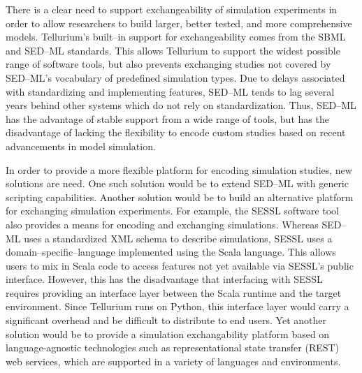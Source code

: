 \documentclass[10pt,letterpaper]{article}
\begin{document}
There is a clear need to support exchangeability of simulation experiments in order to allow researchers to build larger, better tested, and more comprehensive models. Tellurium's built--in support for exchangeability comes from the SBML and SED--ML standards. This allows Tellurium to support the widest possible range of software tools, but also prevents exchanging studies not covered by SED--ML's vocabulary of predefined simulation types. Due to delays associated with standardizing and implementing features, SED--ML tends to lag several years behind other systems which do not rely on standardization. Thus, SED--ML has the advantage of stable support from a wide range of tools, but has the disadvantage of lacking the flexibility to encode custom studies based on recent advancements in model simulation.

In order to provide a more flexible platform for encoding simulation studies, new solutions are need. One such solution would be to extend SED--ML with generic scripting capabilities. Another solution would be to build an alternative platform for exchanging simulation experiments. For example, the SESSL \cite{ewald2014sessl} software tool also provides a means for encoding and exchanging simulations. Whereas SED--ML uses a standardized XML schema to describe simulations, SESSL uses a domain--specific--language implemented using the Scala language. This allows users to mix in Scala code to access features not yet available via SESSL's public interface. However, this has the disadvantage that interfacing with SESSL requires providing an interface layer between the Scala runtime and the target environment. Since Tellurium runs on Python, this interface layer would carry a significant overhead and be difficult to distribute to end users. Yet another solution would be to provide a simulation exchangability platform based on language-agnostic technologies such as representational state transfer (REST) web services, which are supported in a variety of languages and environments.
\end{document}
